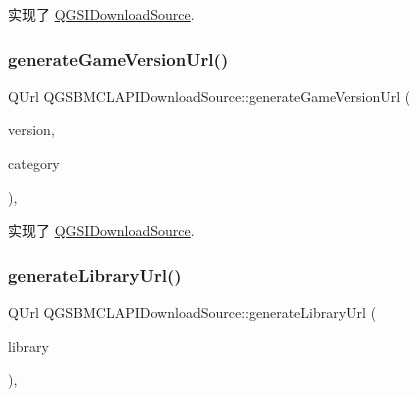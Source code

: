 实现了 \mbox{\hyperlink{class_q_g_s_i_download_source_acf738f516ec5ce173d8a346dfe65976a}{Q\+G\+S\+I\+Download\+Source}}.

\mbox{\label{class_q_g_s_b_m_c_l_a_p_i_download_source_a40528529f6aee100922aecf731f346bf}} 
\subsubsection{\texorpdfstring{generate\+Game\+Version\+Url()}{generateGameVersionUrl()}}
{\footnotesize\ttfamily Q\+Url Q\+G\+S\+B\+M\+C\+L\+A\+P\+I\+Download\+Source\+::generate\+Game\+Version\+Url (\begin{DoxyParamCaption}\item[{const \mbox{\hyperlink{class_q_g_s_game_version}{Q\+G\+S\+Game\+Version}} \&}]{version,  }\item[{const Q\+String \&}]{category }\end{DoxyParamCaption})\hspace{0.3cm}{\ttfamily [override]}, {\ttfamily [virtual]}}



实现了 \mbox{\hyperlink{class_q_g_s_i_download_source_a59b370202b6c3459d70cf6e7f84273e1}{Q\+G\+S\+I\+Download\+Source}}.

\mbox{\label{class_q_g_s_b_m_c_l_a_p_i_download_source_a04a894a9608a9730660e50cb1c80981b}} 
\subsubsection{\texorpdfstring{generate\+Library\+Url()}{generateLibraryUrl()}}
{\footnotesize\ttfamily Q\+Url Q\+G\+S\+B\+M\+C\+L\+A\+P\+I\+Download\+Source\+::generate\+Library\+Url (\begin{DoxyParamCaption}\item[{const \mbox{\hyperlink{class_q_g_s_library}{Q\+G\+S\+Library}} \&}]{library }\end{DoxyParamCaption})\hspace{0.3cm}{\ttfamily [override]}, {\ttfamily [virtual]}}



